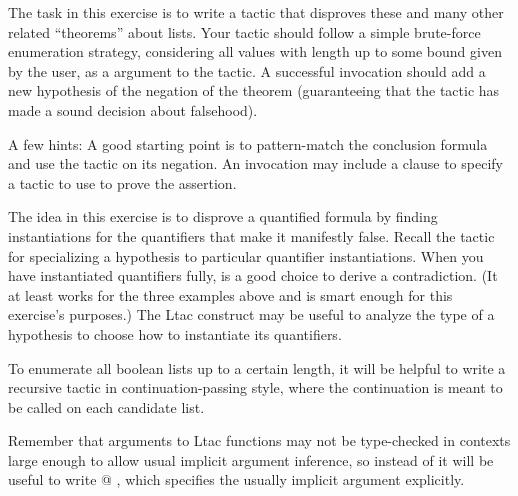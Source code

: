 \documentclass[12pt]{report}
\begin{document}
\begin{enumerate}
\begin{coqdoccode}
\coqdocemptyline
\end{coqdoccode}
The task in this exercise is to write a tactic that disproves these and many other related ``theorems'' about lists.  Your tactic should follow a simple brute-force enumeration strategy, considering all   values with length up to some bound given by the user, as a  argument to the tactic.  A successful invocation should add a new hypothesis of the negation of the theorem (guaranteeing that the tactic has made a sound decision about falsehood).


   A few hints: A good starting point is to pattern-match the conclusion formula and use the  tactic on its negation.  An  invocation may include a  clause to specify a tactic to use to prove the assertion.


   The idea in this exercise is to disprove a quantified formula by finding instantiations for the quantifiers that make it manifestly false.  Recall the  tactic for specializing a hypothesis to particular quantifier instantiations.  When you have instantiated quantifiers fully,  is a good choice to derive a contradiction.  (It at least works for the three examples above and is smart enough for this exercise's purposes.)  The   Ltac construct may be useful to analyze the type of a hypothesis to choose how to instantiate its quantifiers.


   To enumerate all boolean lists up to a certain length, it will be helpful to write a recursive tactic in continuation-passing style, where the continuation is meant to be called on each candidate list.


   Remember that arguments to Ltac functions may not be type-checked in contexts large enough to allow usual implicit argument inference, so instead of  it will be useful to write @ , which specifies the usually implicit argument explicitly.



\end{enumerate}
\end{document}
